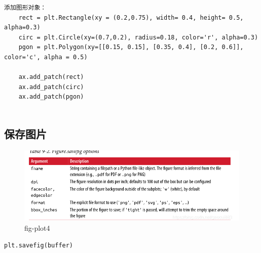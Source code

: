 \documentclass{article}
\begin{document}
\begin{lstlisting}
添加图形对象：
	rect = plt.Rectangle(xy = (0.2,0.75), width= 0.4, height= 0.5, alpha=0.3)
	circ = plt.Circle(xy=(0.7,0.2), radius=0.18, color='r', alpha=0.3)
	pgon = plt.Polygon(xy=[[0.15, 0.15], [0.35, 0.4], [0.2, 0.6]], color='c', alpha = 0.5)
	
	ax.add_patch(rect)
	ax.add_patch(circ)
	ax.add_patch(pgon)
	
\end{lstlisting}
\subsection{保存图片}
\begin{figure}[tbhp]
	\centering
	\includegraphics[width=\linewidth]{fig/p4}
	\caption{fig-plot4}
	\label{fig-shili4}
\end{figure}
\verb|plt.savefig(buffer)|
\end{document}
